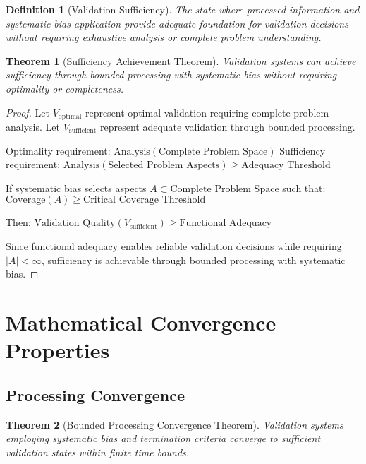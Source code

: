 \documentclass[12pt,a4paper]{article}
\newtheorem{theorem}{Theorem}
\newtheorem{definition}{Definition}
\begin{document}
\begin{definition}[Validation Sufficiency]
The state where processed information and systematic bias application provide adequate foundation for validation decisions without requiring exhaustive analysis or complete problem understanding.
\end{definition}

\begin{theorem}[Sufficiency Achievement Theorem]
Validation systems can achieve sufficiency through bounded processing with systematic bias without requiring optimality or completeness.
\end{theorem}

\begin{proof}
Let $V_{\text{optimal}}$ represent optimal validation requiring complete problem analysis.
Let $V_{\text{sufficient}}$ represent adequate validation through bounded processing.

Optimality requirement: $\text{Analysis}(\text{Complete Problem Space})$
Sufficiency requirement: $\text{Analysis}(\text{Selected Problem Aspects}) \geq \text{Adequacy Threshold}$

If systematic bias selects aspects $A \subset \text{Complete Problem Space}$ such that:
$\text{Coverage}(A) \geq \text{Critical Coverage Threshold}$

Then: $\text{Validation Quality}(V_{\text{sufficient}}) \geq \text{Functional Adequacy}$

Since functional adequacy enables reliable validation decisions while requiring $|A| < \infty$, sufficiency is achievable through bounded processing with systematic bias.
\end{proof}

\section{Mathematical Convergence Properties}

\subsection{Processing Convergence}

\begin{theorem}[Bounded Processing Convergence Theorem]
Validation systems employing systematic bias and termination criteria converge to sufficient validation states within finite time bounds.
\end{theorem}
\end{document}

